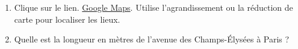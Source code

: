 
\begin{enumerate}
\item Clique sur le lien. \href{https://www.google.com/maps/place/Cart\%5C\%C3\%5C\%A9,+65270,+France/@43.1022476,6.0703528,12.83z/data=!4m5!3m4!1s0xd57cdc9541a448b:0x8f62403cc90fc436!8m2!3d43.11184!4d-0.182035}{Google Maps}. Utilise l'agrandissement ou la réduction de carte pour localiser les lieux.
\item  Quelle est la longueur en mètres de l'avenue des Champs-Élysées à Paris ?
\end{enumerate}